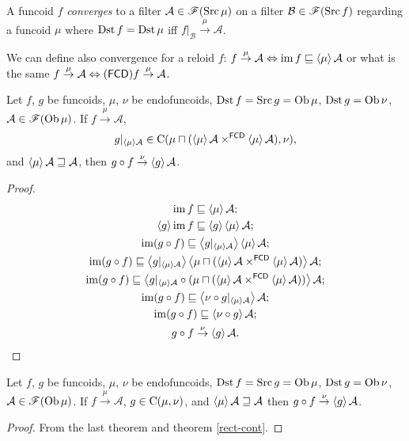 \begin{defn}
A funcoid $f$ \emph{converges}
to a filter $\mathcal{A}\in\mathscr{F}(\operatorname{Src}\mu)$ on a filter $\mathcal{B}\in\mathscr{F}(\operatorname{Src} f)$
regarding a funcoid $\mu$ where $\operatorname{Dst} f=\operatorname{Dst}\mu$ iff $f|_{\mathcal{B}}\overset{\mu}{\rightarrow}\mathcal{A}$.\end{defn}
\begin{rem}
We can define also convergence for a reloid $f$: $f\overset{\mu}{\rightarrow}\mathcal{A}\Leftrightarrow\operatorname{im} f\sqsubseteq\left\langle \mu\right\rangle\mathcal{A}$
or what is the same $f\overset{\mu}{\rightarrow}\mathcal{A}\Leftrightarrow(\mathsf{FCD}) f\overset{\mu}{\rightarrow}\mathcal{A}$.\end{rem}
\begin{thm}
Let $f$, $g$ be funcoids, $\mu$, $\nu$ be endofuncoids, $\operatorname{Dst} f=\operatorname{Src} g=\operatorname{Ob}\mu$,
$\operatorname{Dst} g=\operatorname{Ob}\nu$, $\mathcal{A}\in\mathscr{F}(\operatorname{Ob}\mu)$. If $f\overset{\mu}{\rightarrow}\mathcal{A}$,
\[
g|_{\left\langle \mu\right\rangle\mathcal{A}}\in\mathrm{C}(\mu\sqcap(\left\langle \mu\right\rangle\mathcal{A}\times^{\mathsf{FCD}}\left\langle \mu\right\rangle\mathcal{A}),\nu),
\]
and $\left\langle \mu\right\rangle\mathcal{A}\sqsupseteq\mathcal{A}$, then $g\circ f\overset{\nu}{\rightarrow}\left\langle g\right\rangle\mathcal{A}$.\end{thm}
\begin{proof}
~
\begin{gather*}
\operatorname{im} f\sqsubseteq\left\langle \mu\right\rangle\mathcal{A};\\
\left\langle g\right\rangle\operatorname{im} f\sqsubseteq\left\langle g\right\rangle\left\langle \mu\right\rangle\mathcal{A};\\
\operatorname{im}(g\circ f)\sqsubseteq\left\langle g|_{\left\langle \mu\right\rangle\mathcal{A}}\right\rangle\left\langle \mu\right\rangle\mathcal{A};\\
\operatorname{im}(g\circ f)\sqsubseteq\left\langle g|_{\left\langle \mu\right\rangle\mathcal{A}}\right\rangle\left\langle \mu\sqcap(\left\langle \mu\right\rangle\mathcal{A}\times^{\mathsf{FCD}}\left\langle \mu\right\rangle\mathcal{A})\right\rangle\mathcal{A};\\
\operatorname{im}(g\circ f)\sqsubseteq\left\langle g|_{\left\langle \mu\right\rangle\mathcal{A}}\circ(\mu\sqcap(\left\langle \mu\right\rangle\mathcal{A}\times^{\mathsf{FCD}}\left\langle \mu\right\rangle\mathcal{A}))\right\rangle\mathcal{A};\\
\operatorname{im}(g\circ f)\sqsubseteq\left\langle \nu\circ g|_{\left\langle \mu\right\rangle\mathcal{A}}\right\rangle\mathcal{A};\\
\operatorname{im}(g\circ f)\sqsubseteq\left\langle \nu\circ g\right\rangle\mathcal{A};\\
g\circ f\overset{\nu}{\rightarrow}\left\langle g\right\rangle\mathcal{A}.
\end{gather*}
\end{proof}
\begin{cor}
Let $f$, $g$ be funcoids, $\mu$, $\nu$ be endofuncoids, $\operatorname{Dst} f=\operatorname{Src} g=\operatorname{Ob}\mu$,
$\operatorname{Dst} g=\operatorname{Ob}\nu$, $\mathcal{A}\in\mathscr{F}(\operatorname{Ob}\mu)$. If $f\overset{\mu}{\rightarrow}\mathcal{A}$,
$g\in\mathrm{C}(\mu,\nu)$, and $\left\langle \mu\right\rangle\mathcal{A}\sqsupseteq\mathcal{A}$
then $g\circ f\overset{\nu}{\rightarrow}\left\langle g\right\rangle\mathcal{A}$.\end{cor}
\begin{proof}
From the last theorem and theorem \ref{rect-cont}.
\end{proof}

